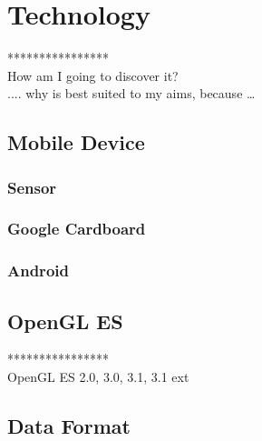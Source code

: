 \label{chapter-technology}
\chapter{Technology}

****************\\
How am I going to discover it?\\
.... why is best suited to my aims, because …\\

\section{Mobile Device}

\subsection{Sensor}

\subsection{Google Cardboard}

\subsection{Android}

\section{OpenGL ES}

****************\\
OpenGL ES 2.0, 3.0,  3.1, 3.1 ext\\

\section{Data Format}

